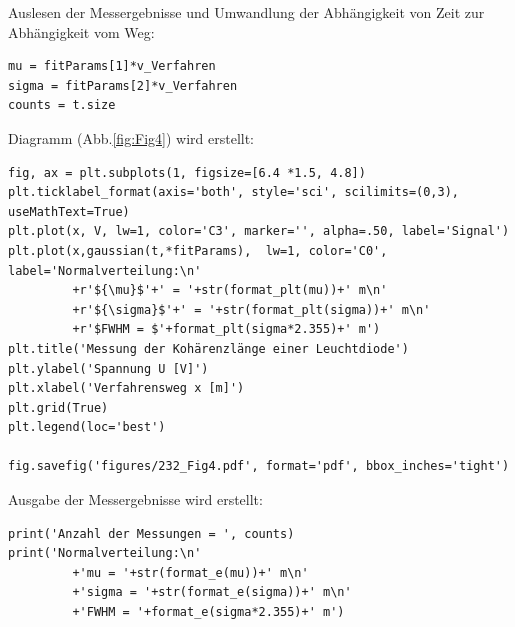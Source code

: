 \documentclass[a4paper,10pt]{article}
\begin{document}
Auslesen der Messergebnisse und Umwandlung der Abhängigkeit von Zeit zur Abhängigkeit vom Weg:\begin{lstlisting}
mu = fitParams[1]*v_Verfahren
sigma = fitParams[2]*v_Verfahren
counts = t.size

\end{lstlisting}

Diagramm (Abb.\ref{fig:Fig4}) wird erstellt:\begin{lstlisting}
fig, ax = plt.subplots(1, figsize=[6.4 *1.5, 4.8])
plt.ticklabel_format(axis='both', style='sci', scilimits=(0,3), useMathText=True)
plt.plot(x, V, lw=1, color='C3', marker='', alpha=.50, label='Signal')
plt.plot(x,gaussian(t,*fitParams),  lw=1, color='C0', label='Normalverteilung:\n'
         +r'${\mu}$'+' = '+str(format_plt(mu))+' m\n'
         +r'${\sigma}$'+' = '+str(format_plt(sigma))+' m\n'
         +r'$FWHM = $'+format_plt(sigma*2.355)+' m')
plt.title('Messung der Kohärenzlänge einer Leuchtdiode')
plt.ylabel('Spannung U [V]')
plt.xlabel('Verfahrensweg x [m]')
plt.grid(True)
plt.legend(loc='best')

fig.savefig('figures/232_Fig4.pdf', format='pdf', bbox_inches='tight')

\end{lstlisting}

Ausgabe der Messergebnisse wird erstellt:\begin{lstlisting}
print('Anzahl der Messungen = ', counts)
print('Normalverteilung:\n'
         +'mu = '+str(format_e(mu))+' m\n'
         +'sigma = '+str(format_e(sigma))+' m\n'
         +'FWHM = '+format_e(sigma*2.355)+' m')
         
\end{lstlisting}
\end{document}

